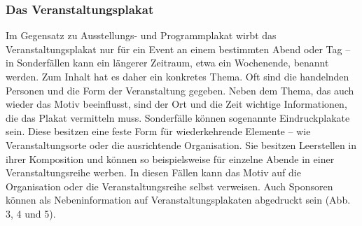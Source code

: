 \documentclass[a4paper,12pt,ngerman]{article}
\begin{document}
\subsubsection{Das Veranstaltungsplakat}
Im Gegensatz zu Ausstellungs- und Programmplakat wirbt das Veranstaltungsplakat nur für ein Event an einem bestimmten Abend oder Tag -- in Sonderfällen kann ein längerer Zeitraum, etwa ein Wochenende, benannt werden. Zum Inhalt hat es daher ein konkretes Thema. Oft sind die handelnden Personen und die Form der Veranstaltung gegeben. Neben dem Thema, das auch wieder das Motiv beeinflusst, sind der Ort und die Zeit wichtige Informationen, die das Plakat vermitteln muss. Sonderfälle können sogenannte Eindruckplakate sein. Diese besitzen eine feste Form für wiederkehrende Elemente -- wie Veranstaltungsorte oder die ausrichtende Organisation. Sie besitzen Leerstellen in ihrer Komposition und können so beispielsweise für einzelne Abende in einer Veranstaltungsreihe werben. In diesen Fällen kann das Motiv auf die Organisation oder die Veranstaltungsreihe selbst verweisen. Auch Sponsoren können als Nebeninformation auf Veranstaltungsplakaten abgedruckt sein (Abb. 3, 4 und 5). \\
\end{document}
